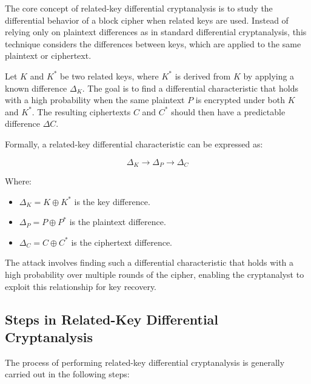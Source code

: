 The core concept of related-key differential cryptanalysis is to study the differential behavior of a block cipher when  related keys are used. Instead of relying only on plaintext differences as in standard differential cryptanalysis, this technique considers the differences between keys, which are applied to the same plaintext or ciphertext.

Let $K$ and $K^*$ be two related keys, where $K^*$ is derived from $K$ by applying a known difference $\Delta_K$. The goal is to find a differential characteristic that holds with a high probability when the same plaintext $P$ is encrypted under both $K$ and $K^*$. The resulting ciphertexts $C$ and $C^*$ should then have a predictable difference $\Delta C$.

Formally, a related-key differential characteristic can be expressed as:

$$
\Delta_K \rightarrow \Delta_P \rightarrow \Delta_C
$$

Where:
\begin{itemize}
    \item $\Delta_K = K \oplus K^*$ is the key difference.
    \item $\Delta_P = P \oplus P^*$ is the plaintext difference.
    \item $\Delta_C = C \oplus C^*$ is the ciphertext difference.
\end{itemize}

The attack involves finding such a differential characteristic that holds with a high probability over multiple rounds of the cipher, enabling the cryptanalyst to exploit this relationship for key recovery.

\subsection{Steps in Related-Key Differential Cryptanalysis}

The process of performing related-key differential cryptanalysis is generally carried out in the following steps:

